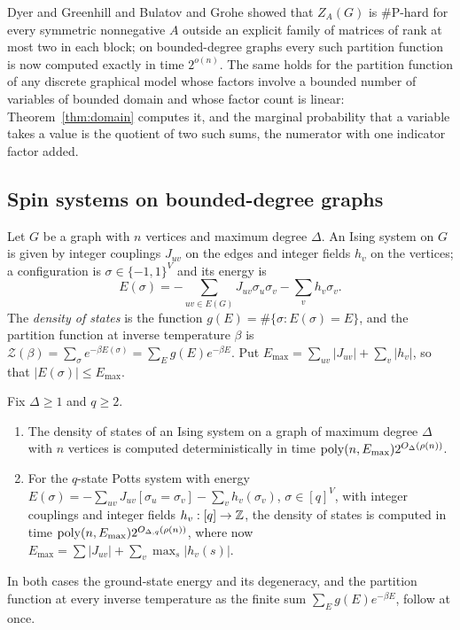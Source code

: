 \begin{remark}
Dyer and Greenhill \cite{DG00} and Bulatov and Grohe \cite{BG05} showed that
$Z_{A}(G)$ is $\#$P-hard for every symmetric nonnegative $A$ outside an
explicit family of matrices of rank at most two in each block; on
bounded-degree graphs every such partition function is now computed exactly in
time $2^{o(n)}$. The same holds for the partition function of any discrete
graphical model whose factors involve a bounded number of variables of bounded
domain and whose factor count is linear: Theorem~\ref{thm:domain} computes it,
and the marginal probability that a variable takes a value is the quotient of
two such sums, the numerator with one indicator factor added.
\end{remark}

\subsection{Spin systems on bounded-degree graphs}\label{ssec:spin}
Let $G$ be a graph with $n$ vertices and maximum degree $\Delta$. An Ising
system on $G$ is given by integer couplings $J_{uv}$ on the edges and integer
fields $h_v$ on the vertices; a configuration is $\sigma\in\{-1,1\}^{V}$ and its
energy is
\begin{equation}\label{eq:ising}
  E(\sigma)=-\sum_{uv\in E(G)}J_{uv}\sigma_u\sigma_v-\sum_{v}h_v\sigma_v .
\end{equation}
The \emph{density of states} is the function $g(E)=\#\{\sigma:E(\sigma)=E\}$, and
the partition function at inverse temperature $\beta$ is
$\mathcal Z(\beta)=\sum_\sigma e^{-\beta E(\sigma)}=\sum_Eg(E)e^{-\beta E}$. Put
$E_{\max}=\sum_{uv}|J_{uv}|+\sum_v|h_v|$, so that $|E(\sigma)|\le E_{\max}$.

\begin{theorem}\label{thm:ising}
Fix $\Delta\ge1$ and $q\ge2$.
\begin{enumerate}[label=(\roman*),leftmargin=2.2em]
\item\label{it:isingmodel} The density of states of an Ising system on a graph of
maximum degree $\Delta$ with $n$ vertices is computed deterministically in time
$\operatorname{poly}(n,E_{\max})2^{O_\Delta(\rho(n))}$.
\item\label{it:potts} For the $q$-state Potts system with energy
$E(\sigma)=-\sum_{uv}J_{uv}[\sigma_u=\sigma_v]-\sum_vh_v(\sigma_v)$,
$\sigma\in[q]^V$, with integer couplings and integer fields $h_v:[q]\to\mathbb{Z}$, the
density of states is computed in time $\operatorname{poly}(n,E_{\max})2^{O_{\Delta,q}(\rho(n))}$,
where now $E_{\max}=\sum|J_{uv}|+\sum_v\max_s|h_v(s)|$.
\end{enumerate}
In both cases the ground-state energy and its degeneracy, and the partition
function at every inverse temperature as the finite sum $\sum_Eg(E)e^{-\beta E}$,
follow at once.
\end{theorem}

